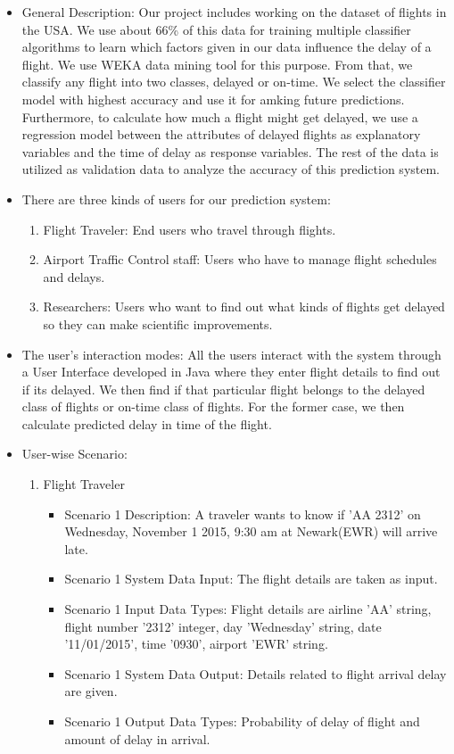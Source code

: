 \begin{itemize} 
\item{General Description: } 
Our project includes working on the dataset of flights in the USA. We use about 66\% of this data for training multiple classifier algorithms to learn which factors given in our data influence the delay of a flight. We use WEKA data mining tool for this purpose. From that, we classify any flight into two classes, delayed or on-time. We select the classifier model with highest accuracy and use it for amking future predictions. Furthermore, to calculate how much a flight might get delayed, we use a regression model between the attributes of delayed flights as explanatory variables and the time of delay as response variables. The rest of the data is utilized as validation data to analyze the accuracy of this prediction system.    
\item{There are three kinds of users for our prediction system: }

\begin{enumerate}
\item{Flight Traveler: End users who travel through flights.}
\item{Airport Traffic Control staff: Users who have to manage flight schedules and delays.}
\item{Researchers: Users who want to find out what kinds of flights get delayed so they can make scientific improvements.}
\end{enumerate}

\item{The user's interaction modes:
All the users interact with the system through a User Interface developed in Java where they enter flight details to find out if its delayed. We then find if that particular flight belongs to the delayed class of flights or on-time class of flights. For the former case, we then calculate predicted delay in time of the flight.
}

\item{User-wise Scenario: }
\begin{enumerate}
\item{Flight Traveler}
	\begin{itemize}
    \item{Scenario 1 Description: }
    A traveler wants to know if 'AA 2312' on Wednesday, November 1 2015, 9:30 am at Newark(EWR) will arrive late.
    \item{Scenario 1 System Data Input: }
    The flight details are taken as input.
    \item{Scenario 1 Input Data Types: }
    Flight details are airline 'AA' string, flight number '2312' integer, day 'Wednesday' string, date '11/01/2015', time '0930', airport 'EWR' string.
    \item{Scenario 1 System Data Output: }
    Details related to flight arrival delay are given.
    \item{Scenario 1 Output Data Types: }
    Probability of delay of flight and amount of delay in arrival.
    

\end{itemize}
\end{enumerate}
\end{itemize}
